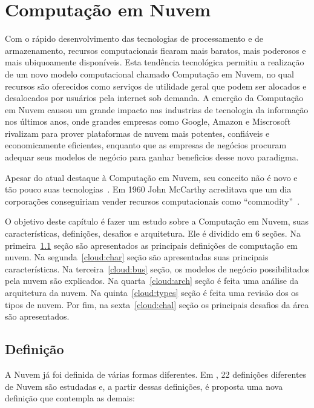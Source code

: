 \chapter{Computação em Nuvem}

Com o rápido desenvolvimento das tecnologias de processamento e de armazenamento, recursos computacionais ficaram mais baratos, mais poderosos e mais ubiquoamente disponíveis. Esta tendência tecnológica permitiu a realização de um novo modelo computacional chamado Computação em Nuvem, no qual recursos são oferecidos como serviços de utilidade geral que podem ser alocados e desalocados por usuários pela internet sob demanda. A emerção da Computação em Nuvem causou um grande impacto nas industrias de tecnologia da informação nos últimos anos, onde grandes empresas como Google, Amazon e Miscrosoft rivalizam para prover plataformas de nuvem mais potentes, confiáveis e economicamente eficientes, enquanto que as empresas de negócios procuram adequar seus modelos de negócio para ganhar beneficios desse novo paradigma.

Apesar do atual destaque à Computação em Nuvem,
 seu conceito não é novo e tão pouco suas
tecnologias~\cite{CloudUncovered:2012}. Em 1960 John McCarthy acreditava que um dia corporações conseguiriam vender recursos computacionais como ``commodity''~\cite{demystifingCloud:2011}.

O objetivo deste capítulo é fazer um estudo sobre a Computação em Nuvem, suas características, definições, desafios e arquitetura. Ele é dividido em 6 seções. Na primeira~\ref{cloud:def} seção são apresentados as
principais definições de computação em nuvem. Na segunda~\ref{cloud:char} seção são
apresentadas suas principais características. Na terceira~\ref{cloud:bus} seção, os modelos de
negócio possibilitados pela nuvem são explicados. Na quarta~\ref{cloud:arch} seção é feita uma
análise da arquitetura da nuvem. Na quinta~\ref{cloud:types} seção é feita uma revisão dos os
tipos de nuvem. Por fim, na sexta~\ref{cloud:chal} seção os principais desafios da área são
apresentados.

\section{Definição} \label{cloud:def}

A Nuvem já foi definida de várias formas diferentes. Em
\cite{CloudDefinition:2009}, 22  definições diferentes de Nuvem são estudadas e, a partir dessas definições, é proposta uma nova definição que contempla as demais:
	
